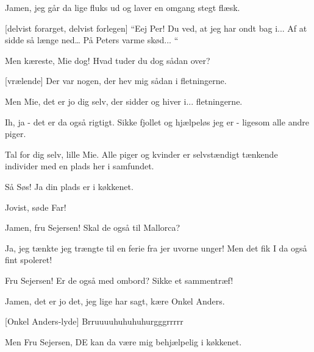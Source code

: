 \documentclass[a4paper,11pt]{article}
\begin{document}
\begin{sketch}

 Jamen, jeg går da lige fluks ud og laver en omgang stegt flæsk.



[delvist forarget, delvist forlegen]  “Eej Per!  Du ved, at jeg har ondt bag i...    Af at sidde så længe ned…  På Peters varme skød... “


 Men kæreste, Mie dog! Hvad tuder du dog sådan over?

[vrælende] Der var nogen, der hev mig sådan i fletningerne.

 Men Mie, det er jo dig selv, der sidder og hiver i... fletningerne.

 Ih, ja - det er da også rigtigt. Sikke fjollet og hjælpeløs jeg er - ligesom alle andre piger.


 Tal for dig selv, lille Mie. Alle piger og kvinder er selvstændigt tænkende individer med en plads her i samfundet.

 Så Søs! Ja din plads er i køkkenet.

 Jovist, søde Far!


 Jamen, fru Sejersen! Skal de også til Mallorca?

 Ja, jeg tænkte jeg trængte til en ferie fra jer uvorne unger! Men det fik I da også fint spoleret!

 Fru Sejersen! Er de også med ombord? Sikke et sammentræf!

 Jamen, det er jo det, jeg lige har sagt, kære Onkel Anders.

[Onkel Anders-lyde] Brruuuuhuhuhuhurgggrrrrr 

 Men Fru Sejersen, DE kan da være mig behjælpelig i køkkenet.


\end{sketch}
\end{document}
